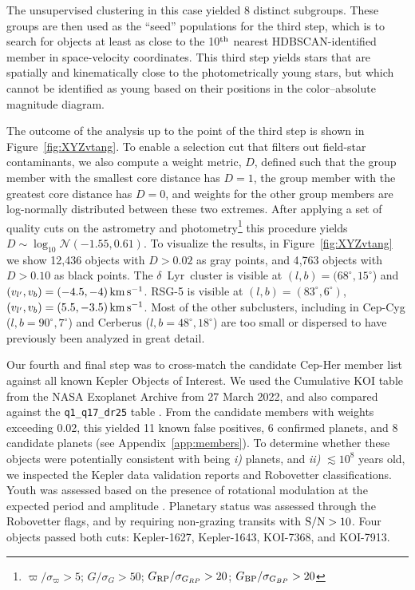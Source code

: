 \documentclass[12pt,twocolumn,tighten,linenumbers,trackchanges]{aastex63}
\newcommand{\mkms}{{\rm \,km\,s^{-1}}}  %
\begin{document}
The unsupervised clustering in this case yielded 8 distinct subgroups.
These groups are then used as the ``seed'' populations for the third
step, which is to search for objects at least as close to the 10$^{\rm
th}$ nearest HDBSCAN-identified member in space-velocity coordinates.
This third step yields stars that are spatially and kinematically
close to the photometrically young stars, but which cannot be
identified as young based on their positions in the color--absolute
magnitude diagram.

The outcome of the analysis up to the point of the third step is shown
in Figure~\ref{fig:XYZvtang}.  To enable a selection cut that filters
out field-star contaminants, we also compute a weight metric,
$D$, defined such that the group member with the smallest core
distance has $D=1$, the group member with the greatest core
distance has $D=0$, and weights for the other group members are
log-normally distributed between these two extremes.  After applying a
set of quality cuts on the astrometry and
photometry\footnote{$\varpi/\sigma_\varpi>5$; $G/\sigma_{G}>50$;
$G_{\rm RP}/\sigma_{G_{RP}}>20$; $G_{\rm BP}/\sigma_{G_{BP}}>20$}
this procedure yields $D \sim \log_{10}\mathcal{N}(-1.55,0.61)$.
To visualize the results, in Figure~\ref{fig:XYZvtang} we show
12{,}436 objects with $D>0.02$ as gray points, and 
4{,}763 objects with $D>0.10$ as black points.  The 
$\delta$~Lyr\ cluster is visible at $(l,b)=(68^\circ,15^\circ$)
and $(v_{l'}, v_b)=(-4.5 ,-4 )\mkms$.  RSG-5 is visible at
$(l,b)=(83^\circ,6^\circ)$, $(v_{l'}, v_b)=(5.5 ,-3.5 )\mkms$.  Most
of the other subclusters, including in Cep-Cyg
($l,b=90^\circ,7^\circ$) and Cerberus ($l,b=48^\circ,18^\circ$) are
too small or dispersed to have previously been analyzed in great
detail.

%
%
Our fourth and final step was to cross-match the candidate Cep-Her
member list against all known Kepler Objects of Interest.  We used the
Cumulative KOI table from the NASA Exoplanet Archive from 27 March
2022, and also compared against the \texttt{q1\_q17\_dr25} table
\citep{thompson_planetary_2018}.  From the candidate members with
weights exceeding 0.02, this yielded 11 known false positives, 6
confirmed planets, and 8 candidate planets (see Appendix~\ref{app:members}).
To determine whether these objects were
potentially consistent with being {\it i)} planets, and {\it ii)}
$\lesssim 10^8$ years old, we inspected the Kepler data validation
reports and Robovetter classifications.  Youth was assessed based on
the presence of rotational modulation at the expected period and
amplitude \citep[{e.g.},][]{rebull_rotation_2020}. 
Planetary status was assessed through the Robovetter flags, and by
requiring non-grazing transits with ${\rm S/N}>10$.
Four objects passed both cuts: Kepler-1627, Kepler-1643, KOI-7368, and
KOI-7913.
\end{document}

